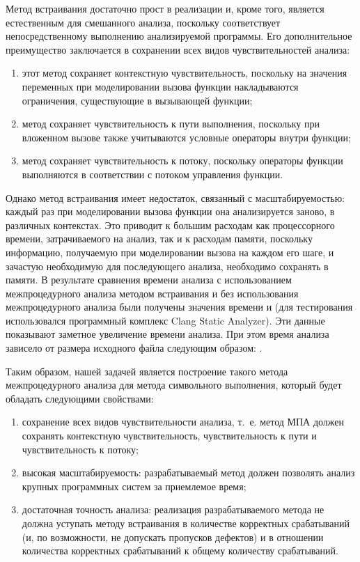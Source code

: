 Метод встраивания достаточно прост в реализации и, кроме того, является естественным для смешанного анализа, поскольку соответствует непосредственному выполнению анализируемой программы. Его дополнительное преимущество заключается в сохранении всех видов чувствительностей анализа:

\begin{enumerate}
 \item этот метод сохраняет контекстную чувствительность, поскольку на значения переменных при моделировании вызова функции накладываются ограничения, существующие в вызывающей функции;
 \item метод сохраняет чувствительность к пути выполнения, поскольку при вложенном вызове также учитываются условные операторы внутри функции;
 \item метод сохраняет чувствительность к потоку, поскольку операторы функции выполняются в соответствии с потоком управления функции.
\end{enumerate}


Однако метод встраивания имеет недостаток, связанный с масштабируемостью: каждый раз при моделировании вызова функции она анализируется заново, в различных контекстах. Это приводит к большим расходам как процессорного времени, затрачиваемого на анализ, так и к расходам памяти, поскольку информацию, получаемую при моделировании вызова на каждом его шаге, и зачастую необходимую для последующего анализа, необходимо сохранять в памяти. В результате сравнения времени анализа с использованием межпроцедурного анализа методом встраивания и без использования межпроцедурного анализа были получены значения времени  и  (для тестирования использовался программный комплекс Clang Static Analyzer). Эти данные показывают заметное увеличение времени анализа. При этом время анализа зависело от размера исходного файла следующим образом: .

Таким образом, нашей задачей является построение такого метода межпроцедурного анализа для метода символьного выполнения, который будет обладать следующими свойствами:

\begin{enumerate}
 \item сохранение всех видов чувствительности анализа, т.~е. метод МПА должен сохранять контекстную чувствительность, чувствительность к пути и чувствительность к потоку;
 \item высокая масштабируемость: разрабатываемый метод должен позволять анализ крупных программных систем за приемлемое время;
 \item достаточная точность анализа: реализация разрабатываемого метода не должна уступать методу встраивания в количестве корректных срабатываний (и, по возможности, не допускать пропусков дефектов) и в отношении количества корректных срабатываний к общему количеству срабатываний.
\end{enumerate}


